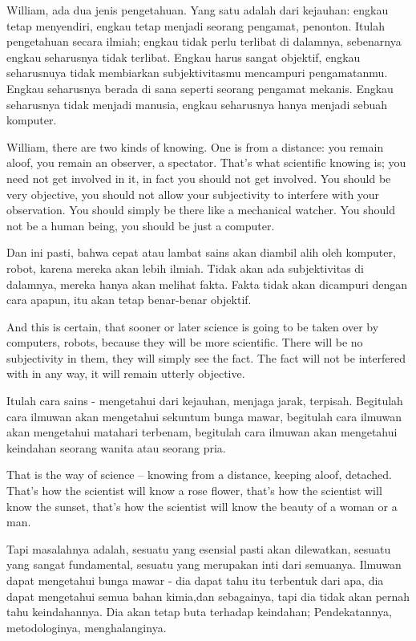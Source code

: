 \bahasa
William, ada dua jenis pengetahuan. Yang satu adalah dari kejauhan: engkau tetap menyendiri, engkau tetap menjadi seorang pengamat, penonton. Itulah pengetahuan secara ilmiah; engkau tidak perlu terlibat di dalamnya, sebenarnya engkau seharusnya tidak terlibat. Engkau harus sangat objektif, engkau seharusnuya tidak membiarkan subjektivitasmu mencampuri pengamatanmu. Engkau seharusnya berada di sana seperti seorang pengamat mekanis. Engkau seharusnya tidak menjadi manusia, engkau seharusnya hanya menjadi sebuah komputer.

\english
William, there are two kinds of knowing. One is from a distance: you remain aloof, you remain an observer, a spectator. That's what scientific knowing is; you need not get involved in it, in fact you should not get involved. You should be very objective, you should not allow your subjectivity to interfere with your observation. You should simply be there like a mechanical watcher. You should not be a human being, you should be just a computer.

\bahasa
Dan ini pasti, bahwa cepat atau lambat sains akan diambil alih oleh komputer, robot, karena mereka akan lebih ilmiah. Tidak akan ada subjektivitas di dalamnya, mereka hanya akan melihat fakta. Fakta tidak akan dicampuri dengan cara apapun, itu akan tetap benar-benar objektif.

\english
And this is certain, that sooner or later science is going to be taken over by computers, robots, because they will be more scientific. There will be no subjectivity in them, they will simply see the fact. The fact will not be interfered with in any way, it will remain utterly objective.

\bahasa
Itulah cara sains - mengetahui dari kejauhan, menjaga jarak, terpisah. Begitulah cara ilmuwan akan mengetahui sekuntum bunga mawar, begitulah cara ilmuwan akan mengetahui matahari terbenam, begitulah cara ilmuwan akan mengetahui keindahan seorang wanita atau seorang pria.

\english
That is the way of science -- knowing from a distance, keeping aloof, detached. That's how the scientist will know a rose flower, that's how the scientist will know the sunset, that's how the scientist will know the beauty of a woman or a man.

\bahasa
Tapi masalahnya adalah, sesuatu yang esensial pasti akan dilewatkan, sesuatu yang sangat fundamental, sesuatu yang merupakan inti dari semuanya. Ilmuwan dapat mengetahui bunga mawar - dia dapat tahu itu terbentuk dari apa, dia dapat mengetahui semua bahan kimia,dan sebagainya, tapi dia tidak akan pernah tahu keindahannya. Dia akan tetap buta terhadap keindahan; Pendekatannya, metodologinya, menghalanginya.

